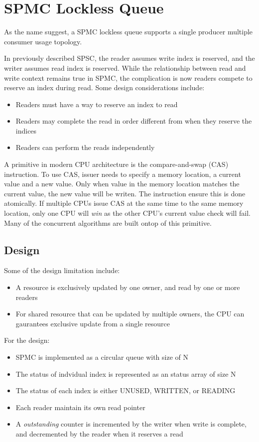 % 

\chapter{SPMC Lockless Queue}

As the name suggest, a SPMC lockless queue supports a single producer multiple
consumer usage topology.\newline

In previously described SPSC, the reader assumes write index is reserved, and
the writer assumes read index is reserved. While the relationship between read
and write context remains true in SPMC, the complication is now readers compete
to reserve an index during read. Some design considerations include:
\begin{itemize}
    \item Readers must have a way to reserve an index to read
    \item Readers may complete the read in order different from when they reserve the indices 
    \item Readers can perform the reads independently
\end{itemize}

A primitive in modern CPU architecture is the compare-and-swap (CAS)
instruction. To use CAS, issuer needs to specify a memory location, a current
value and a new value. Only when value in the memory location matches the
current value, the new value will be writen. The instruction ensure this is done
atomically. If multiple CPUs issue CAS at the same time to the same memory
location, only one CPU will \textit{win} as the other CPU's current value check
will fail. Many of the concurrent algorithms are built ontop of this primitive. 

\section{Design}

Some of the design limitation include:
\begin{itemize}
    \item A resource is exclusively updated by one owner, and read by one or more readers
    \item For shared resource that can be updated by multiple owners, the CPU
    can gaurantees exclusive update from a single resource 
\end{itemize}

For the design:
\begin{itemize}
    \item SPMC is implemented as a circular queue with size of N
    \item The status of indvidual index is represented as an status array of size N
    \item The status of each index is either UNUSED, WRITTEN, or READING
    \item Each reader maintain its own read pointer
    \item A \textit{outstanding} counter is incremented by the writer when write is complete, 
    and decremented by the reader when it reserves a read
\end{itemize}

